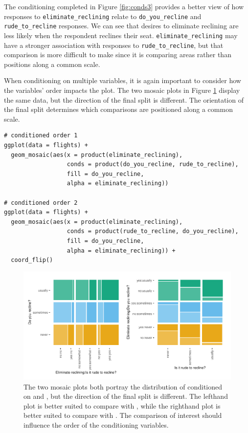 The conditioning completed in Figure \ref{fig:conds3} provides a better view of how responses to \texttt{eliminate\_reclining} relate to \texttt{do\_you\_recline} and \texttt{rude\_to\_recline} responses. We can see that desires to eliminate reclining are less likely when the respondent reclines their seat. \texttt{eliminate\_reclining} may have a stronger association with responses to \texttt{rude\_to\_recline}, but that comparison is more difficult to make since it is comparing areas rather than positions along a common scale.

When conditioning on multiple variables, it is again important to consider how the variables' order impacts the plot. The two mosaic plots in Figure \ref{fig:conds-orders} display the same data, but the direction of the final split is different. The orientation of the final split determines which comparisons are positioned along a common scale.

\begin{verbatim}
# conditioned order 1
ggplot(data = flights) +
  geom_mosaic(aes(x = product(eliminate_reclining), 
                  conds = product(do_you_recline, rude_to_recline), 
                  fill = do_you_recline, 
                  alpha = eliminate_reclining))

# conditioned order 2
ggplot(data = flights) +
  geom_mosaic(aes(x = product(eliminate_reclining), 
                  conds = product(rude_to_recline, do_you_recline), 
                  fill = do_you_recline, 
                  alpha = eliminate_reclining)) + 
  coord_flip()
\end{verbatim}

\begin{figure}

{\centering \includegraphics[width=1\linewidth]{RJ-2023-013_files/figure-latex/conds-orders-1} 

}

\caption{The two mosaic plots both portray the distribution of  conditioned on  and , but the direction of the final split is different. The lefthand plot is better suited to compare  with , while the righthand plot is better suited to compare  with . The comparison of interest should influence the order of the conditioning variables.}\label{fig:conds-orders}
\end{figure}

